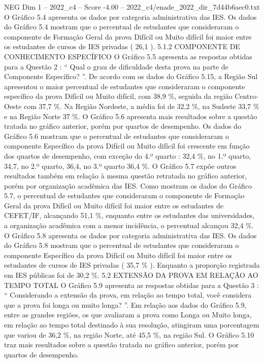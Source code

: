 \begin{textsample}{NEG Dim 1 – 2022\_c4 – Score -4.00 – 2022\_c4/enade\_2022\_dir\_7d44b6aec0.txt}
O Gráfico 5.4 apresenta os dados por categoria administrativa das IES.
Os dados do Gráfico 5.4 mostram que o percentual de estudantes que consideraram o componente de Formação Geral da prova Difícil ou Muito difícil foi maior entre os estudantes de cursos de IES privadas ( 26,1 ). 5.1.2 COMPONENTE DE CONHECIMENTO ESPECÍFICO O Gráfico 5.5 apresenta as respostas obtidas para a Questão 2 : “ Qual o grau de dificuldade desta prova na parte de Componente Específico? ”.
De acordo com os dados do Gráfico 5.15, a Região Sul apresentou o maior percentual de estudantes que consideraram o componente específico da prova Difícil ou Muito difícil, com 38,9 \%, seguida da região Centro-Oeste com 37,7 \%.
Na Região Nordeste, a média foi de 32,2 \%, na Sudeste 33,7 \% e na Região Norte 37 \%.
O Gráfico 5.6 apresenta mais resultados sobre a questão tratada no gráfico anterior, porém por quartos de desempenho.
Os dados do Gráfico 5.6 mostram que o percentual de estudantes que consideraram o componente Específico da prova Difícil ou Muito difícil foi crescente em função dos quartos de desempenho, com exceção do 4.º quarto : 32,4 \%, no 1.º quarto, 34,7, no 2.º quarto, 36,4, no 3.º quarto 36,4 \%.
O Gráfico 5.7 expõe outros resultados também em relação à mesma questão retratada no gráfico anterior, porém por organização acadêmica das IES.
Como mostram os dados do Gráfico 5.7, o percentual de estudantes que consideraram o componente de Formação Geral da prova Difícil ou Muito difícil foi maior entre os estudantes de CEFET/IF, alcançando 51,1 \%, enquanto entre os estudantes das universidades, a organização acadêmica com a menor incidência, o percentual alcançou 32,4 \%.
O Gráfico 5.8 apresenta os dados por categoria administrativa das IES.
Os dados do Gráfico 5.8 mostram que o percentual de estudantes que consideraram o componente Específico da prova Difícil ou Muito difícil foi maior entre os estudantes de cursos de IES privadas ( 35,7 \% ).
Enquanto a proporção registrada em IES públicas foi de 30,2 \%. 5.2 EXTENSÃO DA PROVA EM RELAÇÃO AO TEMPO TOTAL O Gráfico 5.9 apresenta as respostas obtidas para a Questão 3 : “ Considerando a extensão da prova, em relação ao tempo total, você considera que a prova foi longa ou muito longa? ”.
Em relação aos dados do Gráfico 5.9, entre as grandes regiões, os que avaliaram a prova como Longa ou Muito longa, em relação ao tempo total destinado à sua resolução, atingiram uma porcentagem que variou de 36,2 \%, na região Norte, até 45,5 \%, na região Sul.
O Gráfico 5.10 traz mais resultados sobre a questão tratada no gráfico anterior, porém por quartos de desempenho.

\end{textsample}
